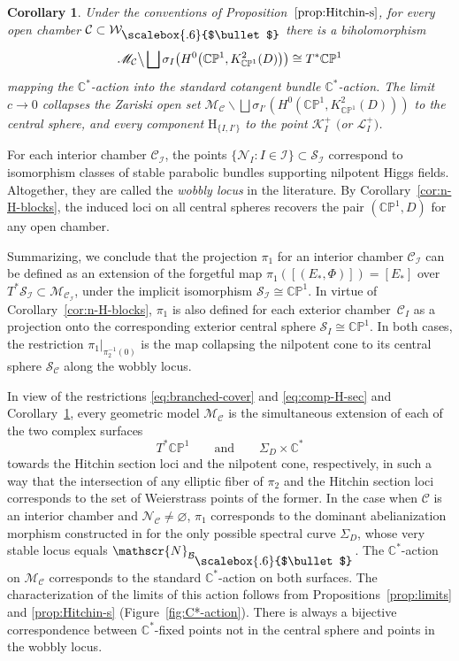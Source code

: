 \documentclass[pdftex]{sigma}
\newcommand{\field}[1]{\ensuremath{\mathbb{#1}}}
\newcommand{\CC}{\field{C}}
\newcommand{\PP}{\field{P}}
\newcommand\sbul[1][.6]{\mathbin{\vcenter{\hbox{\scalebox{#1}{$\bullet$}}}}}
\newcommand{\curly}[1]{\mathscr{#1}}
\newcommand{\cK}{\curly{K}}
\newcommand{\cL}{\curly{L}}
\newcommand{\cM}{\curly{M}}
\newcommand{\cN}{\curly{N}}
\newcommand{\cS}{\curly{S}}
\newcommand{\qB}{\mathcal{B}}
\newcommand{\qC}{\mathcal{C}}
\newcommand{\qI}{\mathcal{I}}
\newcommand{\qW}{\mathcal{W}}
\numberwithin{equation}{section}
\newtheorem{Corollary}[Theorem]{Corollary}
\begin{document}
\begin{Corollary}\label{cor:T*CP1}
Under the conventions of Proposition~$\ref{prop:Hitchin-s}$, for every open chamber $\qC\subset \qW_{\sbul}$ there is a biholomorphism
\begin{gather}\label{eq:comp-H-sec}
\cM_{\qC}\big\backslash\bigsqcup \sigma_{I}\bigl(H^{0}\bigl(\CC\PP^{1},K^{2}_{\CC\PP^{1}}(D)\bigr)\bigr) \cong T^{*}\CC\PP^{1}
\end{gather}
mapping the $\CC^{*}$-action into the standard cotangent bundle $\CC^{*}$-action.
The limit $c\to 0$ collapses the Zariski open set
$\cM_{\qC}\backslash\bigsqcup \sigma_{I'}(H^{0}(\CC\PP^{1},K^{2}_{\CC\PP^{1}}(D)))$
to the central sphere, and every component $\mathrm{H}_{\{I,I'\}}$ to the point $\cK^{+}_{I}$ $($or $\cL^{+}_{I})$.
\end{Corollary}

\begin{Remark}
For each interior chamber $\qC_{\qI}$, the points $\{\cN_{I}\colon I\in\qI\}\subset \cS_{\qI}$ correspond to isomorphism classes of stable parabolic bundles supporting nilpotent Higgs fields. Altogether, they are called the \textit{wobbly locus} in the literature. By Corollary~\ref{cor:n-H-blocks}, the induced loci on all central spheres recovers the pair $(\CC\PP^{1},D)$ for any open chamber.
\end{Remark}

Summarizing, we conclude that the projection $\pi_{1}$ for an interior chamber $\qC_{\qI}$ can be defined as an extension of the forgetful map $\pi_{1}([(E_{*},\Phi)]) = [E_{*}]$
over $T^{*}\cS_{\qI}\subset\cM_{\qC_{\qI}}$, under the implicit isomorphism $\cS_{\qI}\cong \CC\PP^{1}$. In virtue of Corollary~\ref{cor:n-H-blocks}, $\pi_{1}$ is also defined for each exterior chamber~$\qC_{I}$ as a projection onto the corresponding exterior central sphere $\cS_{I}\cong\CC\PP^{1}$.
In both cases, the restriction $\pi_{1}\vert_{\pi^{-1}_{2}(0)}$ is the map collapsing the nilpotent cone to its central sphere $\cS_{\qC}$ along the wobbly locus.

In view of the restrictions \eqref{eq:branched-cover} and \eqref{eq:comp-H-sec} and Corollary~\ref{cor:T*CP1}, every geometric model $\cM_{\qC}$ is the simultaneous extension of each of the two complex surfaces
\[
T^{*}\CC\PP^{1}\qquad \text{and}\qquad \Sigma_{D}\times\CC^{*}
\]
towards the Hitchin section loci and the nilpotent cone, respectively, in such a way that the intersection of any elliptic fiber of $\pi_{2}$ and the Hitchin section loci corresponds to the set of Weierstrass points of the former. In the case when $\qC$ is an interior chamber and $\cN_{\qC}\neq \varnothing $, $\pi_{1}$ corresponds to the dominant abelianization morphism constructed in \cite{BNR89} for the only possible spectral curve $\Sigma_{D}$, whose very stable locus equals $\cN_{\qB_{\sbul}}$.
The $\CC^{*}$-action on $\cM_{\qC}$ corresponds to the standard $\CC^{*}$-action on both surfaces. The characterization of the limits of this action follows from Propositions~\ref{prop:limits} and \ref{prop:Hitchin-s} (Figure~\ref{fig:C*-action}). There is always a bijective correspondence between $\CC^{*}$-fixed points not in the central sphere and points in the wobbly locus.
\end{document}
